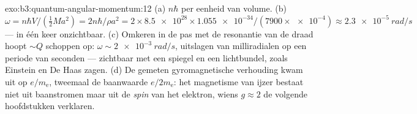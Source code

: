 \begin{solution}{exo:b3:quantum-angular-momentum:12}
(a) $n\hbar$ per eenheid van volume. (b) $\omega = n\hbar V/(\tfrac12 Ma^2)
= 2n\hbar/\rho a^2 = 2 \times \num{8.5e28} \times \num{1.055e-34}/
(7900 \times \num{e-4}) \approx \qty{2.3e-5}{rad/s}$ --- in één keer
onzichtbaar. (c) Omkeren in de pas met de resonantie van de draad hoopt
$\sim Q$ schoppen op: $\omega \sim \qty{2e-3}{rad/s}$, uitslagen van
milliradialen op een periode van seconden --- zichtbaar met een spiegel en
een lichtbundel, zoals Einstein en De Haas zagen. (d) De gemeten
gyromagnetische verhouding kwam uit op $e/m_{\text{e}}$, tweemaal de
baanwaarde $e/2m_{\text{e}}$: het magnetisme van ijzer bestaat niet uit
baanstromen maar uit de \emph{spin} van het elektron, wiens $g \approx 2$
de volgende hoofdstukken verklaren.
\end{solution}

